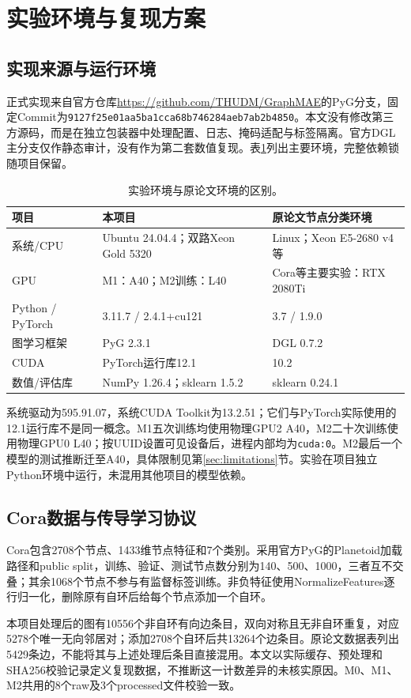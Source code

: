 \section{实验环境与复现方案}\label{sec:protocol}
\subsection{实现来源与运行环境}
正式实现来自官方仓库\url{https://github.com/THUDM/GraphMAE}的PyG分支，固定Commit为\texttt{9127f25e01aa5ba1cca68b746284aeb7ab2b4850}。本文没有修改第三方源码，而是在独立包装器中处理配置、日志、掩码适配与标签隔离。官方DGL主分支仅作静态审计，没有作为第二套数值复现。表\ref{tab:environment}列出主要环境，完整依赖锁随项目保留。
\begin{table}[tbp]
\centering\small
\caption{实验环境与原论文环境的区别。}\label{tab:environment}
\begin{tabularx}{\linewidth}{lXX}\toprule
项目 & 本项目 & 原论文节点分类环境\\\midrule
系统/CPU & Ubuntu 24.04.4；双路Xeon Gold 5320 & Linux；Xeon E5-2680 v4等\\
GPU & M1：A40；M2训练：L40 & Cora等主要实验：RTX 2080Ti\\
Python / PyTorch & 3.11.7 / 2.4.1+cu121 & 3.7 / 1.9.0\\
图学习框架 & PyG 2.3.1 & DGL 0.7.2\\
CUDA & PyTorch运行库12.1 & 10.2\\
数值/评估库 & NumPy 1.26.4；sklearn 1.5.2 & sklearn 0.24.1\\\bottomrule
\end{tabularx}
\end{table}
系统驱动为595.91.07，系统CUDA Toolkit为13.2.51；它们与PyTorch实际使用的12.1运行库不是同一概念。M1五次训练均使用物理GPU2 A40，M2二十次训练使用物理GPU0 L40；按UUID设置可见设备后，进程内部均为\texttt{cuda:0}。M2最后一个模型的测试推断迁至A40，具体限制见第\ref{sec:limitations}节。实验在项目独立Python环境中运行，未混用其他项目的模型依赖。

\subsection{Cora数据与传导学习协议}
Cora包含2708个节点、1433维节点特征和7个类别。采用官方PyG的Planetoid加载路径和public split，训练、验证、测试节点数分别为140、500、1000，三者互不交叠；其余1068个节点不参与有监督标签训练。非负特征使用NormalizeFeatures逐行归一化，删除原有自环后给每个节点添加一个自环。

本项目处理后的图有10556个非自环有向边条目，双向对称且无非自环重复，对应5278个唯一无向邻居对；添加2708个自环后共13264个边条目。原论文数据表列出5429条边，不能将其与上述处理后条目直接混用。本文以实际缓存、预处理和SHA256校验记录定义复现数据，不推断这一计数差异的未核实原因。M0、M1、M2共用的8个raw及3个processed文件校验一致。

